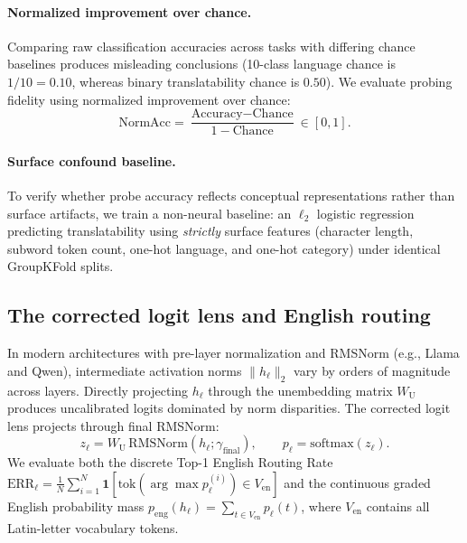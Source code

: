 \documentclass{article}
\begin{document}
\paragraph{Normalized improvement over chance.}
Comparing raw classification accuracies across tasks with differing chance baselines produces misleading conclusions (10-class language chance is $1/10 = 0.10$, whereas binary translatability chance is $0.50$). We evaluate probing fidelity using normalized improvement over chance:
\begin{equation}
\text{NormAcc} = \frac{\text{Accuracy} - \text{Chance}}{1 - \text{Chance}} \in [0, 1].
\label{eq:norm_acc}
\end{equation}

\paragraph{Surface confound baseline.}
To verify whether probe accuracy reflects conceptual representations rather than surface artifacts, we train a non-neural baseline: an $\ell_2$ logistic regression predicting translatability using \emph{strictly} surface features (character length, subword token count, one-hot language, and one-hot category) under identical GroupKFold splits.

\subsection{The corrected logit lens and English routing}

In modern architectures with pre-layer normalization and RMSNorm (e.g., Llama and Qwen), intermediate activation norms $\|h_\ell\|_2$ vary by orders of magnitude across layers. Directly projecting $h_\ell$ through the unembedding matrix $W_{\mathrm{U}}$ produces uncalibrated logits dominated by norm disparities. The corrected logit lens projects through final RMSNorm:
\begin{equation}
z_\ell = W_{\mathrm{U}}\,\mathrm{RMSNorm}(h_\ell; \gamma_{\mathrm{final}}), \qquad p_\ell = \mathrm{softmax}(z_\ell).
\label{eq:lens}
\end{equation}
We evaluate both the discrete Top-1 English Routing Rate $\text{ERR}_\ell = \frac{1}{N}\sum_{i=1}^N \mathbf{1}[\text{tok}(\arg\max p_\ell^{(i)}) \in V_{\mathrm{en}}]$ and the continuous graded English probability mass $p_{\mathrm{eng}}(h_\ell) = \sum_{t \in V_{\mathrm{en}}} p_\ell(t)$, where $V_{\mathrm{en}}$ contains all Latin-letter vocabulary tokens.
\end{document}
